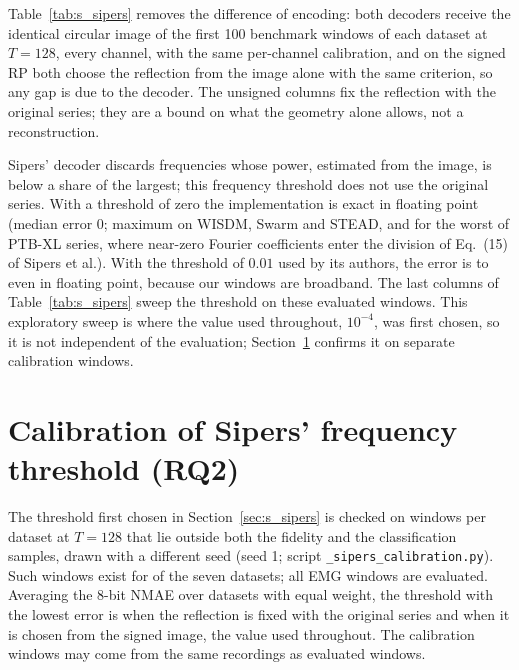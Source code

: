 \documentclass[preprint,12pt]{elsarticle}
\begin{document}
Table~\ref{tab:s_sipers} removes the difference of encoding: both decoders receive the identical circular image of the first 100 benchmark windows of each dataset at $T=128$, every channel, with the same per-channel calibration, and on the signed RP both choose the reflection from the image alone with the same criterion, so any gap is due to the decoder. The unsigned columns fix the reflection with the original series; they are a bound on what the geometry alone allows, not a reconstruction.

Sipers' decoder discards frequencies whose power, estimated from the image, is below a share of the largest; this frequency threshold does not use the original series. With a threshold of zero the implementation is exact in floating point (median error $0$; maximum \sipZeroMaxClean{} on WISDM, Swarm and STEAD, and \sipZeroMaxPtb{} for the worst of \sipZeroPtbSeries{} PTB-XL series, where near-zero Fourier coefficients enter the division of Eq.~(15) of Sipers et al.). With the threshold of $0.01$ used by its authors, the error is \sipPaperTolMin{} to \sipPaperTolMax{} even in floating point, because our windows are broadband. The last columns of Table~\ref{tab:s_sipers} sweep the threshold on these evaluated windows. This exploratory sweep is where the value used throughout, $10^{-4}$, was first chosen, so it is not independent of the evaluation; Section~\ref{sec:s_calibration} confirms it on separate calibration windows.

\begin{table}[H]
\centering
\caption{Mean 8-bit NMAE on the same circular RP ($T=128$, first 100 benchmark windows per dataset). Unsigned: reflection fixed with the original series, a bound on the geometry alone. Signed: reflection chosen from the image by the sign, as in the main text. Last columns: Sipers' decoder on the unsigned image against the frequency threshold.}\label{tab:s_sipers}
\scriptsize
\setlength{\tabcolsep}{3pt}

\end{table}

\section{Calibration of Sipers' frequency threshold (RQ2)}\label{sec:s_calibration}
The threshold first chosen in Section~\ref{sec:s_sipers} is checked on \calWindows{} windows per dataset at $T=128$ that lie outside both the fidelity and the classification samples, drawn with a different seed (seed 1; script \texttt{\_sipers\_calibration.py}). Such windows exist for \calDatasets{} of the seven datasets; all EMG windows are evaluated. Averaging the 8-bit NMAE over datasets with equal weight, the threshold with the lowest error is \calTolOracle{} when the reflection is fixed with the original series and \calTolSigned{} when it is chosen from the signed image, the value used throughout. The calibration windows may come from the same recordings as evaluated windows.
\end{document}

